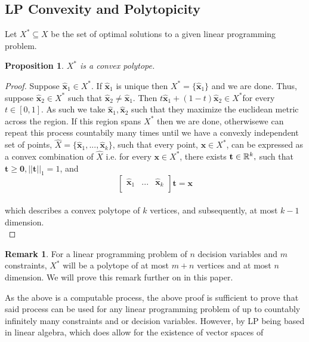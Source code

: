 \documentclass[conference]{IEEEtran}
\numberwithin{equation}{section}
\numberwithin{figure}{section}
\theoremstyle{plain}
\newtheorem{prop}[equation]{Proposition}
\theoremstyle{definition}
\newtheorem{remark}[equation]{Remark}
\newcommand{\R}{\ensuremath \mathbb{R}}
\newcommand{\1}{\ensuremath \mathbbm{1}}
\begin{document}
\subsection{LP Convexity and Polytopicity}
Let $X^* \subseteq X$ be the set of optimal solutions to a given linear 
programming problem. \\
\begin{prop}
$X^*$ is a convex polytope. \\
\end{prop}
\begin{proof}
Suppose $\mathbf{\hat{x}}_1 \in X^*$. If $\mathbf{\hat{x}}_1$ is unique then $X^* 
= \{\mathbf{\hat{x}}_1\}$ and we are done. Thus, suppose $\mathbf{\hat{x}}_2 \in 
X^*$ such that $\mathbf{\hat{x}}_2 \neq \mathbf{\hat{x}}_1$. Then $t
\mathbf{\hat{x}}_1 + (1-t)\mathbf{\hat{x}}_2 \in X^*$for every $t \in [0,1]$. As 
such we take $\mathbf{\hat{x}}_1, \mathbf{\hat{x}}_2$ such that they maximize the 
euclidean metric across the region. If this region spans $X^*$ then we are done, 
otherwisewe can repeat this process countabily many times until we have a 
convexly independent set of points, $\hat{X} = \{\mathbf{\hat{x}}_1,...,
\mathbf{\hat{x}}_k\}$, such that every point, $\mathbf{x} \in X^*$, can be 
expressed as a convex combination of $\hat{X}$ i.e. for every $\mathbf{x} \in 
X^*$, there exists $\mathbf{t} \in \R^k,$ such that $\mathbf{t} \geq \mathbf{0}, 
||\mathbf{t}||_1 = 1$, and \\ 
\[\begin{bmatrix} \mathbf{\hat{x}}_1 & ... & \mathbf{\hat{x}}_k \\ \end{bmatrix}
\mathbf{t} = \mathbf{x}\] \\
which describes a convex polytope of $k$ vertices, and subsequently, at most 
$k-1$ dimension. \\
\end{proof}
\begin{remark}
For a linear programming problem of $n$ decision variables and $m$ constraints, 
$X^*$ will be a polytope of at most $m+n$ vertices and at most $n$ dimension. We 
will prove this remark further on in this paper. \\
\end{remark}
As the above is a computable process, the above proof is sufficient to prove that 
said process can be used for any linear programming problem of up to countably 
infinitely many constraints and or decision variables. However, by LP being based 
in linear algebra, which does allow for the existence of vector spaces of 
\end{document}

